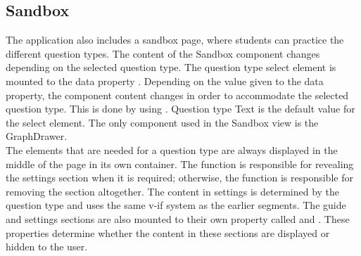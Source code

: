 \subsection{Sandbox}
The application also includes a sandbox page, where students can practice the different question types. The content of the Sandbox component changes depending on the selected question type. The question type select element is mounted to the data property . Depending on the value given to the  data property, the component content changes in order to accommodate the selected question type. This is done by using . Question type Text is the default value for the select element. The only component used in the Sandbox view is the GraphDrawer.
\\[11pt]
The elements that are needed for a question type are always displayed in the middle of the page in its own container. The  function is responsible for revealing the settings section when it is required; otherwise, the function is responsible for removing the section altogether.  The content in settings is determined by the question type and uses the same v-if system as the earlier segments. The guide and settings sections are also mounted to their own property called  and . These properties determine whether the content in these sections are displayed or hidden to the user.
